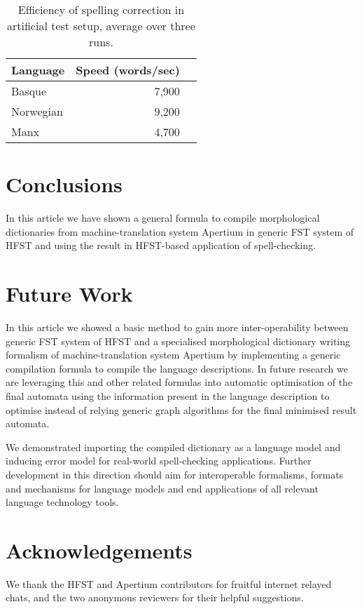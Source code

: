 \documentclass[10pt,a4paper]{article}
\begin{document}
\begin{table}[h]
\begin{center}
\begin{tabular}{|l|r|r|}
\hline
\bf Language & \bf Speed (words/sec) \\
\hline
Basque       &  7,900 \\
Norwegian    &  9,200 \\
Manx         &  4,700 \\
\hline
\end{tabular}
\caption{Efficiency of spelling correction in artificial test setup, average 
  over three runs.}
\label{table:spelling}
\end{center}
\end{table}

\section{Conclusions}
\label{sec:conclusions}

In this article we have shown a general formula to compile morphological
dictionaries from machine-translation system Apertium in generic FST system of
HFST and using the result in HFST-based application of spell-checking.

\section{Future Work}
\label{sec:future}

In this article we showed a basic method to gain more inter-operability between
generic FST system of HFST and a specialised morphological dictionary writing
formalism of machine-translation system Apertium by implementing a generic
compilation formula to compile the language descriptions. In future research
we are leveraging this and other related formulas into automatic optimisation
of the final automata using the information present in the language description
to optimise instead of relying generic graph algorithms for the final minimised
result automata.
 
We demonstrated importing the compiled dictionary as a language model and
inducing error model for real-world spell-checking applications. Further
development in this direction should aim for interoperable formalisms, formats
and mechanisms for language models and end applications of all relevant
language technology tools.

\section*{Acknowledgements}

We thank the HFST and Apertium contributors for fruitful internet relayed chats,
and the two anonymous reviewers for their helpful suggestions.



\end{document}
